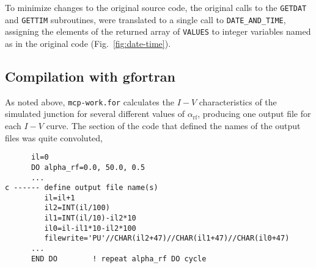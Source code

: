 To minimize changes to the original source code, the original calls to the \lstinline[columns=fixed]{GETDAT} and \lstinline[columns=fixed]{GETTIM} subroutines, were translated to a single call to \lstinline[columns=fixed]{DATE_AND_TIME}, assigning the elements of the returned array of \texttt{VALUES} to integer variables named as in the original code (Fig.~\ref{fig:date-time}).




%



\subsection{Compilation with gfortran}
\label{compilation-with-gfortran}


As noted above, \texttt{mcp-work.for} calculates the $I - V$ characteristics of the simulated junction for several different values of $\alpha_\mathrm{rf}$, producing one output file for each $I - V$ curve. The section of the code that defined the names of the output files was quite convoluted,

\begin{lstlisting}
      il=0
      DO alpha_rf=0.0, 50.0, 0.5
      ...
c ------ define output file name(s)
         il=il+1
         il2=INT(il/100)
         il1=INT(il/10)-il2*10
         il0=il-il1*10-il2*100
         filewrite='PU'//CHAR(il2+47)//CHAR(il1+47)//CHAR(il0+47)
      ...
      END DO        ! repeat alpha_rf DO cycle

\end{lstlisting}

